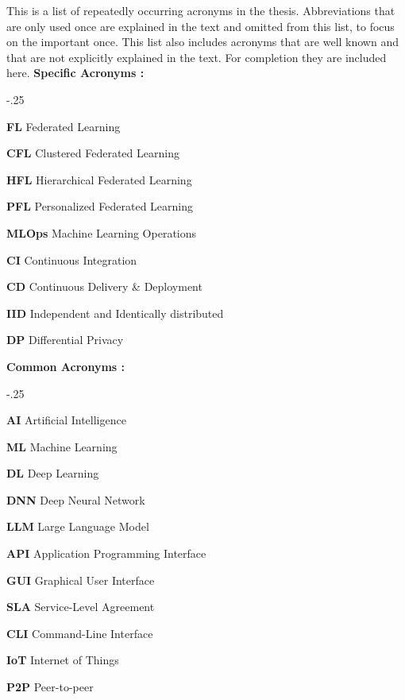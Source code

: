 This is a list of repeatedly occurring acronyms in the thesis.
Abbreviations that are only used once are explained in the text and omitted from this list,
to focus on the important once.
This list also includes acronyms that are well known and that are not explicitly explained in the text.
For completion they are included here.
\vspace{5mm}
\newline
\textbf{Specific Acronyms :}
\begin{acronym}
    \itemsep-.25\baselineskip
    \item[\textbf{FL}] Federated Learning 
    \item[\textbf{CFL}] Clustered Federated Learning 
    \item[\textbf{HFL}] Hierarchical Federated Learning 
    \item[\textbf{PFL}] Personalized Federated Learning 
    \item[\textbf{MLOps}] Machine Learning Operations
    \item[\textbf{CI}] Continuous Integration
    \item[\textbf{CD}] Continuous Delivery \& Deployment
    \item[\textbf{IID}] Independent and Identically distributed
    \item[\textbf{DP}] Differential Privacy 
\end{acronym}
\textbf{Common Acronyms :}
\begin{acronym}
    \itemsep-.25\baselineskip
    \item[\textbf{AI}] Artificial Intelligence
    \item[\textbf{ML}] Machine Learning
    \item[\textbf{DL}] Deep Learning
    \item[\textbf{DNN}] Deep Neural Network
    \item[\textbf{LLM}] Large Language Model
    \item[\textbf{API}] Application Programming Interface
    \item[\textbf{GUI}] Graphical User Interface
    \item[\textbf{SLA}] Service-Level Agreement
    \item[\textbf{CLI}] Command-Line Interface
    \item[\textbf{IoT}] Internet of Things
    \item[\textbf{P2P}] Peer-to-peer
\end{acronym}